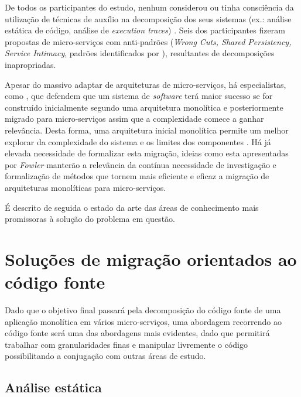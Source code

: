     De todos os participantes do estudo, nenhum considerou ou tinha consciência da utilização de técnicas de auxílio na decomposição dos seus sistemas (ex.: análise estática de código, análise de \textit{execution traces}) \cite{fritzsch19_migration_in_industry}. Seis dos participantes fizeram propostas de micro-serviços com anti-padrões (\textit{Wrong Cuts, Shared Persistency, Service Intimacy}, padrões identificados por \cite{taibi18_architectural_patterns}), resultantes de decomposições inapropriadas.
    
    
    
    Apesar do massivo adaptar de arquiteturas de micro-serviços, há especialistas, como \cite{fowler15_monolith_first}, que defendem que um sistema de \textit{software} terá maior sucesso se for construído inicialmente segundo uma arquitetura monolítica e posteriormente migrado para micro-serviços assim que a complexidade comece a ganhar relevância. Desta forma, uma arquitetura inicial monolítica permite um melhor explorar da complexidade do sistema e os limites dos componentes \cite{fowler15_monolith_first}. 
    Há já elevada necessidade de formalizar esta migração, ideias como esta apresentadas por \textit{Fowler} manterão a relevância da contínua necessidade de investigação e formalização de métodos que tornem mais eficiente e eficaz a migração de arquiteturas monolíticas para micro-serviços.
    
    
    
    É descrito de seguida o estado da arte das áreas de conhecimento mais promissoras à solução do problema em questão.

\section{Soluções de migração orientados ao código fonte}

    Dado que o objetivo final passará pela decomposição do código fonte de uma aplicação monolítica em vários micro-serviços, uma abordagem recorrendo ao código fonte será uma das abordagens mais evidentes, dado que permitirá trabalhar com granularidades finas e manipular livremente o código possibilitando a conjugação com outras áreas de estudo.

\subsection{Análise estática}

